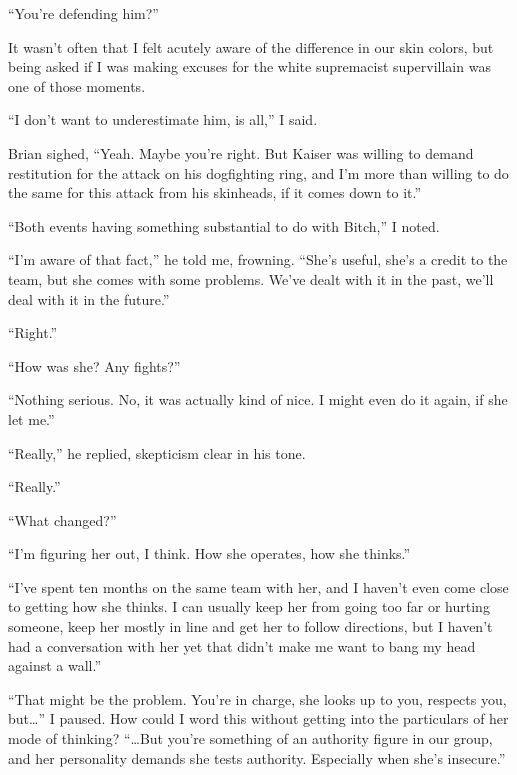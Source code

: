 ``You're defending him?''



It wasn't often that I felt acutely aware of the difference in our skin colors, but being asked if I was making excuses for the white supremacist supervillain was one of those moments.



``I don't want to underestimate him, is all,'' I said.



Brian sighed, ``Yeah.  Maybe you're right.  But Kaiser was willing to demand restitution for the attack on his dogfighting ring, and I'm more than willing to do the same for this attack from his skinheads, if it comes down to it.''



``Both events having something substantial to do with Bitch,'' I noted.



``I'm aware of that fact,'' he told me, frowning.  ``She's useful, she's a credit to the team, but she comes with some problems.  We've dealt with it in the past, we'll deal with it in the future.''



``Right.''



``How was she?  Any fights?''



``Nothing serious.  No, it was actually kind of nice.  I might even do it again, if she let me.''



``Really,'' he replied, skepticism clear in his tone.



``Really.''



``What changed?''



``I'm figuring her out, I think.  How she operates, how she thinks.''



``I've spent ten months on the same team with her, and I haven't even come close to getting how she thinks.  I can usually keep her from going too far or hurting someone, keep her mostly in line and get her to follow directions, but I haven't had a conversation with her yet that didn't make me want to bang my head against a wall.''



``That might be the problem.  You're in charge, she looks up to you, respects you, but\ldots'' I paused.  How could I word this without getting into the particulars of her mode of thinking?  ``\ldots{}But you're something of an authority figure in our group, and her personality demands she tests authority.  Especially when she's insecure.''



